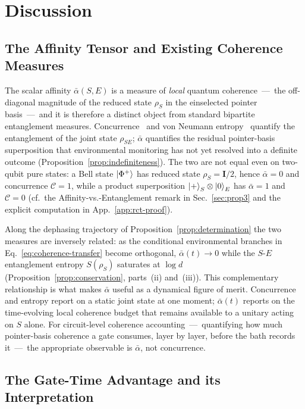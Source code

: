 
\section{Discussion}
\label{sec:disc}

\subsection{The Affinity Tensor and Existing Coherence Measures}

The scalar affinity $\bar\alpha(S,E)$ is a measure of \emph{local}
quantum coherence~---~the off-diagonal magnitude of the reduced state
$\rho_S$ in the einselected pointer basis~---~and it is therefore a
distinct object from standard bipartite entanglement measures.
Concurrence~\cite{Wootters1998} and von Neumann
entropy~\cite{vonNeumann1932} quantify the entanglement of the joint
state $\rho_{SE}$; $\bar\alpha$ quantifies the residual pointer-basis
superposition that environmental monitoring has not yet resolved into a
definite outcome (Proposition~\ref{prop:indefiniteness}).
The two are not equal even on two-qubit pure states: a Bell state
$\ket{\Phi^+}$ has reduced state $\rho_S = \mathbf{I}/2$, hence
$\bar\alpha = 0$ and concurrence $\mathcal{C} = 1$, while a product
superposition $\ket{+}_S\otimes\ket{0}_E$ has $\bar\alpha = 1$ and
$\mathcal{C} = 0$ (cf.\ the Affinity-vs.-Entanglement remark in
Sec.~\ref{sec:prop3} and the explicit computation in
App.~\ref{app:rct-proof}).

Along the dephasing trajectory of Proposition~\ref{prop:determination}
the two measures are inversely related: as the conditional environmental
branches in Eq.~\eqref{eq:coherence-transfer} become orthogonal,
$\bar\alpha(t) \to 0$ while the $S$-$E$ entanglement entropy $S(\rho_S)$
saturates at $\log d$ (Proposition~\ref{prop:conservation}, parts~(ii)
and~(iii)).
This complementary relationship is what makes $\bar\alpha$ useful as a
dynamical figure of merit.
Concurrence and entropy report on a static joint state at one moment;
$\bar\alpha(t)$ reports on the time-evolving local coherence budget that
remains available to a unitary acting on $S$ alone.
For circuit-level coherence accounting~---~quantifying how much
pointer-basis coherence a gate consumes, layer by layer, before the
bath records it~---~the appropriate observable is $\bar\alpha$, not
concurrence.

\subsection{The Gate-Time Advantage and its Interpretation}

